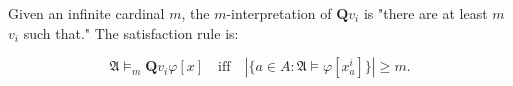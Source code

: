Given an infinite cardinal $m$, the $m$-interpretation of $\mathbf{Q}v_i$ is "there are at least $m$ $v_i$ such that." The satisfaction rule is:

$$\mathfrak{A} \models_m \mathbf{Q}v_i\varphi[x] \quad \text{iff} \quad |\{a \in A : \mathfrak{A} \models \varphi[x_a^i]\}| \geq m.$$

